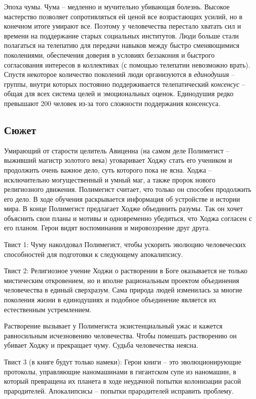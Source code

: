 \documentclass[12pt,a4paper]{article}
\begin{document}
Эпоха чумы. Чума -- медленно и мучительно убивающая болезнь. Высокое мастерство позволяет сопротивляться ей ценой все возрастающих усилий, но в конечном итоге умирают все. Поэтому у человечества перестало хватать сил и времени на поддержание старых социальных институтов. Люди больше стали полагаться на телепатию для передачи навыков между быстро сменяющимися поколениями, обеспечения доверия в условиях беззакония и быстрого согласования интересов в коллективах (с помощью телепатии невозможно врать). Спустя некоторое количество поколений люди организуются в \textit{единодушия} -- группы, внутри которых постоянно поддерживается телепатический \textit{консенсус} -- общая для всех система целей и эмоциональных оценок. Единодушия редко превышают 200 человек из-за того сложности поддержания консенсуса.

\subsection*{Сюжет}

Умирающий от старости целитель Авиценна (на самом деле Полимегист -- выживший магистр золотого века) уговаривает Ходжу стать его учеником и продолжить очень важное дело, суть которого пока не ясна. Ходжа -- исключительно могущественный и умный маг, а также пророк нового религиозного движения. Полимегист считает, что только он способен продолжить его дело. В ходе обучения раскрывается информация об устройстве и истории мира. В конце Полимегист предлагает Ходже объединить разумы. Так он хочет объяснить свои планы и мотивы и одновременно убедиться, что Ходжа согласен с его планом. Герои видят воспоминания и мировоззрение друг друга.

Твист 1: Чуму наколдовал Полимегист, чтобы ускорить эволюцию человеческих способностей для подготовки к следующему апокалипсису.

Твист 2: Религиозное учение Ходжи о растворении в Боге оказывается не только мистическим откровением, но и вполне рациональным проектом объединения человечества в единый сверхразум. Сама природа людей изменилась за многие поколения жизни в единодушиях и подобное объединение является их естественным устремлением.

Растворение вызывает у Полимегиста экзистенциальный ужас и кажется равносильным исчезновению человечества. Чтобы помешать растворению он убивает Ходжу и прекращает чуму. Судьба человечества неясна.

Твист 3 (в книге будут только намеки): Герои книги -- это эволюционирующие протоколы, управляющие наномашинами в гигантском супе из наномашин, в который превращена их планета в ходе неудачной попытки колонизации расой прародителей. Апокалипсисы -- попытки прародителей исправить проблему.
\end{document}
